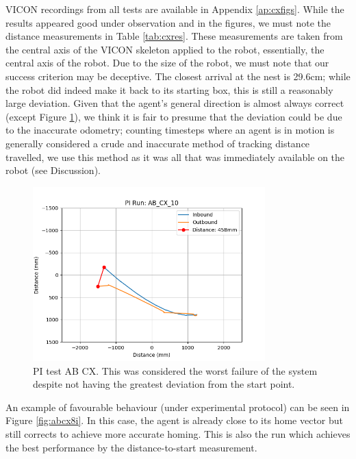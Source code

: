 \documentclass[a4paper,11pt,twoside,openright]{article}
\begin{document}
VICON recordings from all tests are available in Appendix
\ref{ap:cxfigs}. While the results appeared good under observation and
in the figures, we must note the distance measurements in Table
\ref{tab:cxres}. These measurements are taken from the central axis of
the VICON skeleton applied to the robot, essentially, the central axis
of the robot. Due to the size of the robot, we must note that our
success criterion may be deceptive. The closest arrival at the nest is
29.6cm; while the robot did indeed make it back to its starting box,
this is still a reasonably large deviation. Given that the agent's
general direction is almost always correct (except Figure
\ref{fig:abcx10i}), we think it is fair to presume that the deviation
could be due to the inaccurate odometry; counting timesteps where an
agent is in motion is generally considered a crude and inaccurate
method of tracking distance travelled, we use this method as it was
all that was immediately available on the robot (see Discussion).
\newline\par

\begin{figure}[h!]
  \centering
  \includegraphics[width=0.8\textwidth]{AB_CX_10}
  \caption{\label{fig:abcx10i} PI test AB\textunderscore
    CX. This was considered the worst failure of the
  system despite not having the greatest deviation from the start point.}
\end{figure}

An example of favourable behaviour (under experimental protocol) can
be seen in Figure \ref{fig:abcx8i}. In this case, the agent is already
close to its home vector but still corrects to achieve more accurate
homing. This is also the run which achieves the best performance by
the distance-to-start measurement.
\newline\par
\end{document}
